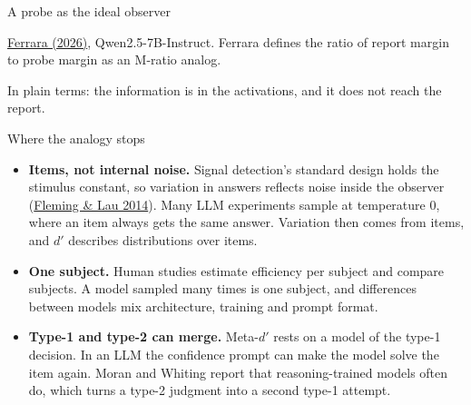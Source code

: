 \documentclass[aspectratio=169,11pt]{beamer}
\newcommand{\FL}{\href{https://www.frontiersin.org/articles/10.3389/fnhum.2014.00443/pdf}{Fleming \& Lau 2014}}
\newcommand{\site}{https://measuring-self-reports.github.io/measuring-self-reports}
\newcommand{\partslide}[2]{%
\begin{frame}[plain,label=#1]
\vfill
\begin{center}
  \setlength{\fboxrule}{2.5pt}%
  \fcolorbox{black}{white}{\parbox{0.65\textwidth}{\centering\vspace{0.8em}
    {\Large\bfseries #2}
  \vspace{0.8em}}}
\end{center}
\vfill
\end{frame}}
\begin{document}
\begin{frame}[label=probe]{A probe as the ideal observer}

\vspace{0.2em}
\begin{center}
\end{center}

\vspace{0.2em}
{\small \href{\site/papers/ferrara-2026/}{Ferrara (2026)}, Qwen2.5-7B-Instruct. Ferrara defines the ratio of report margin to probe margin as an M-ratio analog.}

\vspace{0.2em}
{\small In plain terms: the information is in the activations, and it does not reach the report.}
\end{frame}

\partslide{part5}{Part 5\\[0.5em]{\large\mdseries Limits}}

\begin{frame}[label=limits]{Where the analogy stops}
\begin{itemize}\setlength\itemsep{8pt}
  \item {\small \textbf{Items, not internal noise.} Signal detection's standard design holds the stimulus constant, so variation in answers reflects noise inside the observer (\FL). Many LLM experiments sample at temperature 0, where an item always gets the same answer. Variation then comes from items, and $d'$ describes distributions over items.}
  \item {\small \textbf{One subject.} Human studies estimate efficiency per subject and compare subjects. A model sampled many times is one subject, and differences between models mix architecture, training and prompt format.}
  \item {\small \textbf{Type-1 and type-2 can merge.} Meta-$d'$ rests on a model of the type-1 decision. In an LLM the confidence prompt can make the model solve the item again. Moran and Whiting report that reasoning-trained models often do, which turns a type-2 judgment into a second type-1 attempt.}
\end{itemize}
\end{frame}
\end{document}
